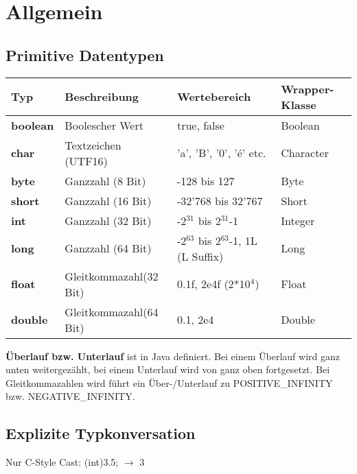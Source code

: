 \vspace{-0.5cm}
\section*{Allgemein}
	\begin{minipage}[t]{12.5cm}
		\subsection*{Primitive Datentypen}
			\begin{tabular}{|>{\bfseries}l l l l|}
				\hline Typ & \bfseries{Beschreibung} & \bfseries{Wertebereich} & \bfseries{Wrapper-Klasse}
				\\\hline   boolean & Boolescher Wert & true, false & Boolean
				\\ char & Textzeichen (UTF16) & 'a', 'B', '0', 'é' etc. & Character
				\\ byte & Ganzzahl (8 Bit) & -128 bis 127 & Byte
				\\ short & Ganzzahl (16 Bit) & -32'768 bis 32'767 & Short
				\\ int & Ganzzahl (32 Bit) & -2$^{31}$ bis 2$^{31}$-1 & Integer
				\\ long & Ganzzahl (64 Bit) & -2$^{63}$ bis 2$^{63}$-1, 1L (L Suffix) & Long
				\\ float & Gleitkommazahl(32 Bit) & 0.1f, 2e4f (2*10$^4$) & Float
				\\ double & Gleitkommazahl(64 Bit) & 0.1, 2e4 & Double
				\\\hline
			\end{tabular}
		\end{minipage}
		\hspace*{0.6cm}
		\begin{minipage}[t]{5.7cm}
			\vspace*{0.7cm}
			\textbf{Überlauf bzw. Unterlauf} ist in Java definiert. Bei einem Überlauf wird ganz unten weitergezählt, bei einem Unterlauf wird von ganz oben fortgesetzt. Bei Gleitkommazahlen wird führt ein Über-/Unterlauf zu POSITIVE\_INFINITY bzw. NEGATIVE\_INFINITY.
			\subsection*{Explizite Typkonversation}
			Nur C-Style Cast: (int)3.5; $\rightarrow$ 3
			\\
		\end{minipage}
	
	\vspace{0.3cm}
